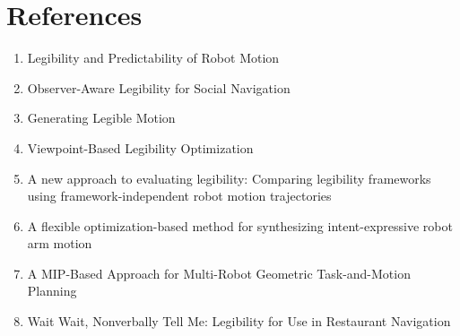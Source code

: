 \section{References}

\begin{enumerate}
    \item Legibility and Predictability of Robot Motion
    \item Observer-Aware Legibility for Social Navigation
    \item Generating Legible Motion
    \item Viewpoint-Based Legibility Optimization
    \item A new approach to evaluating legibility: Comparing legibility frameworks using framework-independent robot motion trajectories
    \item A flexible optimization-based method for synthesizing intent-expressive robot arm motion
    \item A MIP-Based Approach for Multi-Robot Geometric Task-and-Motion Planning
    \item Wait Wait, Nonverbally Tell Me: Legibility for Use in Restaurant Navigation
\end{enumerate}
